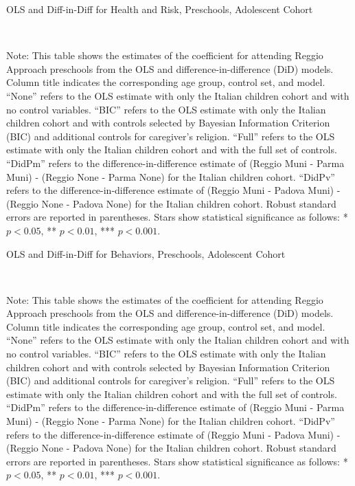 \begin{table}[H] \caption{OLS and Diff-in-Diff for Health and Risk, Preschools, Adolescent Cohort} \label{ols-W-reg}
\scalebox{0.76}{
}
\vspace{1ex} \\
\footnotesize\raggedright{Note: This table shows the estimates of the coefficient for attending Reggio Approach preschools from the OLS and difference-in-difference (DiD) models. Column title indicates the corresponding age group, control set, and model. ``None'' refers to the OLS estimate with only the Italian children cohort and with no control variables. ``BIC'' refers to the OLS estimate with only the Italian children cohort and with controls selected by Bayesian Information Criterion (BIC) and additional controls for caregiver's religion. ``Full'' refers to the OLS estimate with only the Italian children cohort and with the full set of controls. ``DidPm'' refers to the difference-in-difference estimate of (Reggio Muni - Parma Muni) - (Reggio None - Parma None) for the Italian children cohort. ``DidPv'' refers to the difference-in-difference estimate of (Reggio Muni - Padova Muni) - (Reggio None - Padova None) for the Italian children cohort.  Robust standard errors are reported in parentheses. Stars show statistical significance as follows: * $p < 0.05$, ** $p < 0.01$, *** $p < 0.001$.}
\end{table}


\begin{table}[H] \caption{OLS and Diff-in-Diff for Behaviors, Preschools, Adolescent Cohort} \label{ols-L-reg}
\scalebox{0.80}{
}
\vspace{1ex} \\
\footnotesize\raggedright{Note: This table shows the estimates of the coefficient for attending Reggio Approach preschools from the OLS and difference-in-difference (DiD) models. Column title indicates the corresponding age group, control set, and model. ``None'' refers to the OLS estimate with only the Italian children cohort and with no control variables. ``BIC'' refers to the OLS estimate with only the Italian children cohort and with controls selected by Bayesian Information Criterion (BIC) and additional controls for caregiver's religion. ``Full'' refers to the OLS estimate with only the Italian children cohort and with the full set of controls. ``DidPm'' refers to the difference-in-difference estimate of (Reggio Muni - Parma Muni) - (Reggio None - Parma None) for the Italian children cohort. ``DidPv'' refers to the difference-in-difference estimate of (Reggio Muni - Padova Muni) - (Reggio None - Padova None) for the Italian children cohort.  Robust standard errors are reported in parentheses. Stars show statistical significance as follows: * $p < 0.05$, ** $p < 0.01$, *** $p < 0.001$.}
\end{table}

